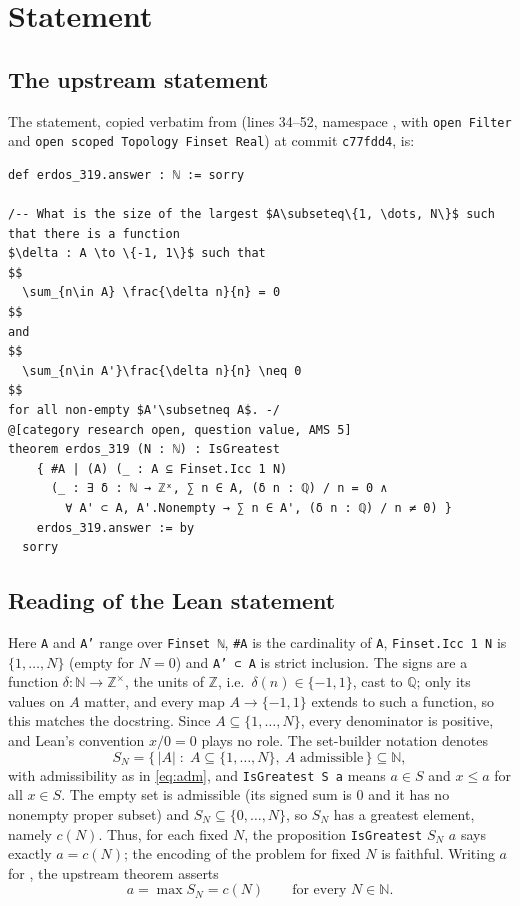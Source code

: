 \documentclass[11pt]{amsart}
\theoremstyle{plain}
\theoremstyle{definition}
\newcommand{\N}{\mathbb{N}}
\newcommand{\Q}{\mathbb{Q}}
\newcommand{\Z}{\mathbb{Z}}
\begin{document}
\section{Statement}\label{sec:statement}

\subsection{The upstream statement}
The statement, copied verbatim from  (lines 34--52, namespace , with \texttt{open Filter} and \texttt{open scoped Topology Finset Real}) at commit \texttt{c77fdd4}, is:
\begin{lstlisting}
def erdos_319.answer : ℕ := sorry

/-- What is the size of the largest $A\subseteq\{1, \dots, N\}$ such that there is a function
$\delta : A \to \{-1, 1\}$ such that
$$
  \sum_{n\in A} \frac{\delta n}{n} = 0
$$
and
$$
  \sum_{n\in A'}\frac{\delta n}{n} \neq 0
$$
for all non-empty $A'\subsetneq A$. -/
@[category research open, question value, AMS 5]
theorem erdos_319 (N : ℕ) : IsGreatest
    { #A | (A) (_ : A ⊆ Finset.Icc 1 N)
      (_ : ∃ δ : ℕ → ℤˣ, ∑ n ∈ A, (δ n : ℚ) / n = 0 ∧
        ∀ A' ⊂ A, A'.Nonempty → ∑ n ∈ A', (δ n : ℚ) / n ≠ 0) }
    erdos_319.answer := by
  sorry
\end{lstlisting}

\subsection{Reading of the Lean statement}
Here \texttt{A} and \texttt{A'} range over \texttt{Finset ℕ}, \texttt{\#A} is the cardinality of \texttt{A}, \texttt{Finset.Icc 1 N} is $\{1,\dots,N\}$ (empty for $N=0$) and \texttt{A' ⊂ A} is strict inclusion. The signs are a function $\delta\colon\N\to\Z^\times$, the units of $\Z$, i.e.\ $\delta(n)\in\{-1,1\}$, cast to $\Q$; only its values on $A$ matter, and every map $A\to\{-1,1\}$ extends to such a function, so this matches the docstring. Since $A\subseteq\{1,\dots,N\}$, every denominator is positive, and Lean's convention $x/0=0$ plays no role. The set-builder notation denotes
\[
S_N=\bigl\{\,|A| \;:\; A\subseteq\{1,\dots,N\},\ A \text{ admissible}\,\bigr\}\subseteq\N,
\]
with admissibility as in \eqref{eq:adm}, and \texttt{IsGreatest S a} means $a\in S$ and $x\le a$ for all $x\in S$. The empty set is admissible (its signed sum is $0$ and it has no nonempty proper subset) and $S_N\subseteq\{0,\dots,N\}$, so $S_N$ has a greatest element, namely $c(N)$. Thus, for each fixed $N$, the proposition \texttt{IsGreatest} $S_N$ $a$ says exactly $a=c(N)$; the encoding of the problem for fixed $N$ is faithful. Writing $a$ for , the upstream theorem asserts
\begin{equation}\label{eq:upstream}
a=\max S_N=c(N)\qquad\text{for every } N\in\N .
\end{equation}
\end{document}
